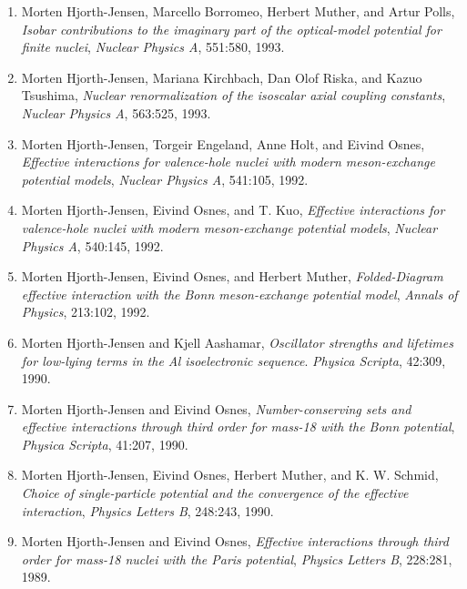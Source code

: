 \documentclass[a4wide,10pt]{article}
\begin{document}
\begin{enumerate}
\item Morten Hjorth-Jensen, Marcello Borromeo, Herbert Muther, and Artur Polls, \emph{Isobar contributions to the imaginary part of the optical-model   potential for finite nuclei},  \emph{Nuclear Physics A}, 551:580, 1993. 

\item Morten Hjorth-Jensen, Mariana Kirchbach, Dan Olof Riska, and Kazuo Tsushima, \emph{Nuclear renormalization of the isoscalar axial coupling   constants},  \emph{Nuclear Physics A}, 563:525, 1993. 

\item Morten Hjorth-Jensen, Torgeir Engeland, Anne Holt, and Eivind Osnes, \emph{Effective interactions for valence-hole nuclei with modern   meson-exchange potential models},  \emph{Nuclear Physics A}, 541:105, 1992. 

\item Morten Hjorth-Jensen, Eivind Osnes, and T. Kuo, \emph{Effective interactions for valence-hole nuclei with modern   meson-exchange potential models},  \emph{Nuclear Physics A}, 540:145, 1992. 

\item Morten Hjorth-Jensen, Eivind Osnes, and Herbert Muther, \emph{Folded-Diagram effective interaction with the Bonn meson-exchange potential model},  \emph{Annals of Physics}, 213:102, 1992. 

\item Morten Hjorth-Jensen and Kjell Aashamar, \emph{Oscillator strengths and lifetimes for low-lying terms in the Al isoelectronic sequence}.  \emph{Physica Scripta}, 42:309, 1990. 

\item Morten Hjorth-Jensen and Eivind Osnes, \emph{Number-conserving sets and effective interactions through third order for mass-18 with the Bonn potential},  \emph{Physica Scripta}, 41:207, 1990. 

\item Morten Hjorth-Jensen, Eivind Osnes, Herbert Muther, and K. W. Schmid, \emph{Choice of single-particle potential and the convergence of the   effective interaction}, \emph{Physics Letters B}, 248:243, 1990. 

\item Morten Hjorth-Jensen and Eivind Osnes, \emph{Effective interactions through third order for mass-18 nuclei with the Paris potential}, \emph{Physics Letters B}, 228:281, 1989.   
\end{enumerate}
\end{document}
